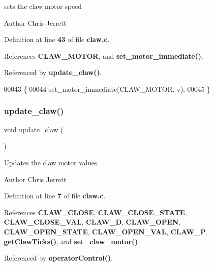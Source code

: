 sets the claw motor speed 

\begin{DoxyAuthor}{Author}
Chris Jerrett 
\end{DoxyAuthor}


Definition at line \textbf{ 43} of file \textbf{ claw.\+c}.



References \textbf{ C\+L\+A\+W\+\_\+\+M\+O\+T\+OR}, and \textbf{ set\+\_\+motor\+\_\+immediate()}.



Referenced by \textbf{ update\+\_\+claw()}.


\begin{DoxyCode}
00043                                 \{
00044   set_motor_immediate(CLAW_MOTOR, v);
00045 \}
\end{DoxyCode}
\mbox{\label{claw_8h_a0122b78972344264b8a276a559cfce4a}} 
\subsubsection{update\+\_\+claw()}
{\footnotesize\ttfamily void update\+\_\+claw (\begin{DoxyParamCaption}{ }\end{DoxyParamCaption})}



Updates the claw motor values. 

\begin{DoxyAuthor}{Author}
Chris Jerrett 
\end{DoxyAuthor}


Definition at line \textbf{ 7} of file \textbf{ claw.\+c}.



References \textbf{ C\+L\+A\+W\+\_\+\+C\+L\+O\+SE}, \textbf{ C\+L\+A\+W\+\_\+\+C\+L\+O\+S\+E\+\_\+\+S\+T\+A\+TE}, \textbf{ C\+L\+A\+W\+\_\+\+C\+L\+O\+S\+E\+\_\+\+V\+AL}, \textbf{ C\+L\+A\+W\+\_\+D}, \textbf{ C\+L\+A\+W\+\_\+\+O\+P\+EN}, \textbf{ C\+L\+A\+W\+\_\+\+O\+P\+E\+N\+\_\+\+S\+T\+A\+TE}, \textbf{ C\+L\+A\+W\+\_\+\+O\+P\+E\+N\+\_\+\+V\+AL}, \textbf{ C\+L\+A\+W\+\_\+P}, \textbf{ get\+Claw\+Ticks()}, and \textbf{ set\+\_\+claw\+\_\+motor()}.



Referenced by \textbf{ operator\+Control()}.



